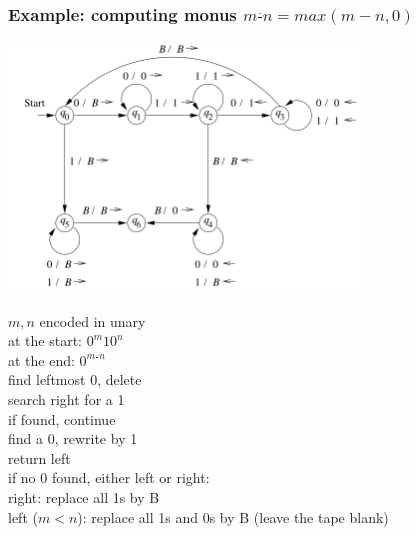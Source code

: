 \documentclass[handout]{beamer}
\begin{document}
\begin{frame}
    \frametitle{Example: computing \alert{monus} $m\frac{.}{\ } n=max(m-n,0)$}
    \small
    \vspace{-6pt}
    \begin{center}        
        \includegraphics[width=0.7\textwidth]{files/tmta.PNG}
    \end{center}
    

    \vspace{-15pt}
    \begin{multicols}{2}
        $m,n$ encoded in unary\\
        at the start: $0^{m}10^n$\\
        at the end: $0^{m\frac{.}{\ } n}$\\
        find leftmost 0, delete\\
        search right for a 1\\
        if found, continue\\
        find a 0, rewrite by 1\\
        return left\\
        if no 0 found, either left or right:\\
        right: replace all 1s by B\\
        left ($m<n$): replace all 1s and 0s by B (leave the tape blank)      
    \end{multicols}

\end{frame}
\end{document}
